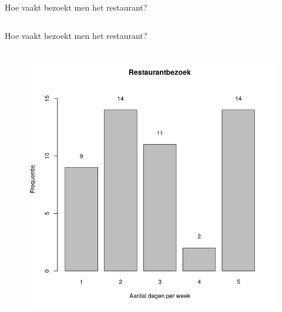 \documentclass[aspectratio=169]{beamer}
\begin{document}
\begin{frame}{Hoe vaakt bezoekt men het restaurant?}
\begin{columns}
\begin{column}{0.5\textwidth}
    \end{column}
  \end{columns}
\end{frame}

\begin{frame}{Hoe vaakt bezoekt men het restaurant?}
  
  \begin{columns}
    
    \begin{column}{0.5\textwidth}
      \begin{figure}
        \centering
        \includegraphics[height=.8\textheight]{img/2var-barplot-aantalbezoeken}
        \label{fig:studentenbar}
      \end{figure}
    \end{column}
  

\end{columns}
\end{frame}
\end{document}
